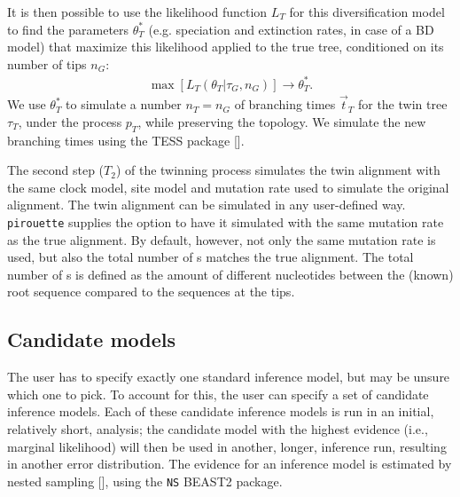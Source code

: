 It is then possible to use the likelihood function 
$L_{\mathit{T}}$ for this diversification model to find 
the parameters $\theta^{*}_{\mathit{T}}$ 
(e.g. speciation and extinction rates, in case of a BD model) 
that maximize this likelihood applied 
to the true tree, conditioned on its number of tips $n_{\mathit{G}}$:
\begin{align}
    \max[L_{\mathit{T}}(\theta_{\mathit{T}}|\tau_{\mathit{G}}, n_{\mathit{G}})] 
\rightarrow \theta^{*}_{\mathit{T}}.
\end{align}
We use $\theta^{*}_{\mathit{T}}$ to simulate a number 
$n_{\mathit{T}} = n_{\mathit{G}}$ 
of branching times $\Vec{t}_{\mathit{T}}$ for the twin tree 
$\tau_{\mathit{T}}$, under the process $p_{T}$, 
while preserving the topology. 
We simulate the new branching times using the TESS 
package [\cite{TESS, hohna2016tess}].

The second step ($T_2$) of the twinning process simulates the twin alignment 
with the same clock model, site model and mutation rate 
used to simulate the original alignment. 
The twin alignment can be simulated in any user-defined way.
\verb;pirouette; supplies the option to have it simulated with
the same mutation rate as the true alignment. By default, however,
not only the same mutation rate is used, but also the total number of 
s
matches the true alignment. The total number of s is defined
as the amount of different nucleotides between the (known) root sequence
compared to the sequences at the tips.

\subsection{Candidate models}\label{subsec:candidates}

The user has to specify exactly one standard inference model,
but may be unsure which one to pick. To account for this, the user can
specify a set of candidate inference models. Each of these candidate inference models is run in an initial, relatively short, analysis; the candidate model with the highest 
evidence (i.e., marginal likelihood) will then be
used in another, longer, inference run, resulting in another error distribution.
The evidence for an inference model is estimated by nested 
sampling [\cite{russel2019model}], using the \verb;NS; BEAST2 package. 

